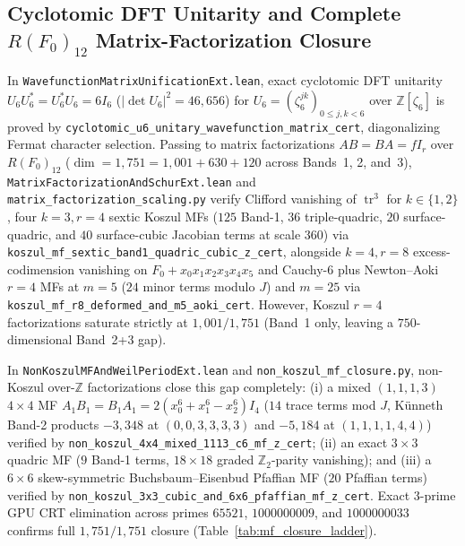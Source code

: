 \documentclass[11pt,a4paper]{article}
\begin{document}
\subsection{Cyclotomic DFT Unitarity and Complete $R(F_0)_{12}$ Matrix-Factorization Closure}

In {\small\texttt{WavefunctionMatrixUnificationExt.lean}}, exact cyclotomic DFT unitarity $U_6 U_6^* = U_6^* U_6 = 6 I_6$ ($|\det U_6|^2 = 46{,}656$) for $U_6 = (\zeta_6^{jk})_{0 \le j,k < 6}$ over $\mathbb{Z}[\zeta_6]$ is proved by {\small\texttt{cyclotomic\_\allowbreak{}u6\_\allowbreak{}unitary\_\allowbreak{}wavefunction\_\allowbreak{}matrix\_\allowbreak{}cert}}, diagonalizing Fermat character selection. Passing to matrix factorizations $AB = BA = f I_r$ over $R(F_0)_{12}$ ($\dim = 1{,}751 = 1{,}001 + 630 + 120$ across Bands~1, 2, and~3), {\small\texttt{MatrixFactorizationAndSchurExt.lean}} and {\small\texttt{matrix\_\allowbreak{}factorization\_\allowbreak{}scaling.py}} verify Clifford vanishing of $\operatorname{tr}^3$ for $k \in \{1,2\}$, four $k=3, r=4$ sextic Koszul MFs ($125$ Band-1, $36$ triple-quadric, $20$ surface-quadric, and $40$ surface-cubic Jacobian terms at scale $360$) via {\small\texttt{koszul\_\allowbreak{}mf\_\allowbreak{}sextic\_\allowbreak{}band1\_\allowbreak{}quadric\_\allowbreak{}cubic\_\allowbreak{}z\_\allowbreak{}cert}}, alongside $k=4, r=8$ excess-codimension vanishing on $F_0 + x_0 x_1 x_2 x_3 x_4 x_5$ and Cauchy-$6$ plus Newton--Aoki $r=4$ MFs at $m=5$ ($24$ minor terms modulo $J$) and $m=25$ via {\small\texttt{koszul\_\allowbreak{}mf\_\allowbreak{}r8\_\allowbreak{}deformed\_\allowbreak{}and\_\allowbreak{}m5\_\allowbreak{}aoki\_\allowbreak{}cert}}. However, Koszul $r=4$ factorizations saturate strictly at $1{,}001/1{,}751$ (Band~1 only, leaving a $750$-dimensional Band~2+3 gap).

In {\small\texttt{NonKoszulMFAndWeilPeriodExt.lean}} and {\small\texttt{non\_\allowbreak{}koszul\_\allowbreak{}mf\_\allowbreak{}closure.py}}, non-Koszul over-$\mathbb{Z}$ factorizations close this gap completely: (i) a mixed $(1,1,1,3)$ $4\times 4$ MF $A_1 B_1 = B_1 A_1 = 2(x_0^6 + x_1^6 - x_2^6)I_4$ ($14$ trace terms mod $J$, K\"unneth Band-2 products $-3{,}348$ at $(0,0,3,3,3,3)$ and $-5{,}184$ at $(1,1,1,1,4,4)$) verified by {\small\texttt{non\_\allowbreak{}koszul\_\allowbreak{}4x4\_\allowbreak{}mixed\_\allowbreak{}1113\_\allowbreak{}c6\_\allowbreak{}mf\_\allowbreak{}z\_\allowbreak{}cert}}; (ii) an exact $3\times 3$ quadric MF ($9$ Band-1 terms, $18\times 18$ graded $\mathbb{Z}_2$-parity vanishing); and (iii) a $6\times 6$ skew-symmetric Buchsbaum--Eisenbud Pfaffian MF ($20$ Pfaffian terms) verified by {\small\texttt{non\_\allowbreak{}koszul\_\allowbreak{}3x3\_\allowbreak{}cubic\_\allowbreak{}and\_\allowbreak{}6x6\_\allowbreak{}pfaffian\_\allowbreak{}mf\_\allowbreak{}z\_\allowbreak{}cert}}. Exact $3$-prime GPU CRT elimination across primes $65521$, $1000000009$, and $1000000033$ confirms full $1{,}751/1{,}751$ closure (Table~\ref{tab:mf_closure_ladder}).
\end{document}
